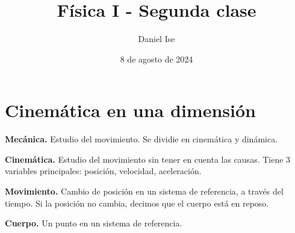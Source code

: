 \documentclass{article}
\title{Física I - Segunda clase}
\author{Daniel Ise}
\date{8 de agosto de 2024}
\begin{document}
\maketitle

\section*{Cinemática en una dimensión}

\textbf{Mecánica.} Estudio del movimiento. Se dividie en cinemática y dinámica.

\textbf{Cinemática.} Estudio del movimiento sin tener en cuenta las causas.
Tiene 3 variables principales: posición, velocidad, aceleración.

\textbf{Movimiento.} Cambio de posición en un sistema de referencia, a través
del tiempo. Si la posición no cambia, decimos que el cuerpo está en reposo.

\textbf{Cuerpo.} Un punto en un sistema de referencia.
\end{document}
